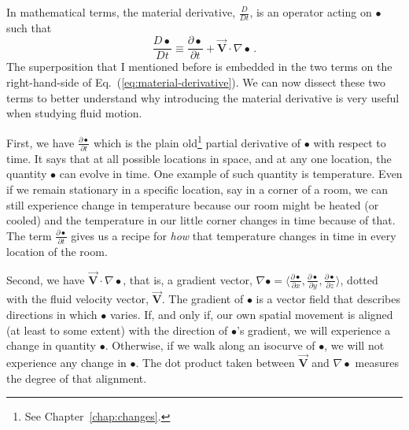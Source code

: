 In mathematical terms, the material derivative, $\frac{D}{Dt}$, is an operator acting on $\bullet$ such that
\begin{equation} \label{eq:material-derivative}
\frac{D \bullet}{D t} \equiv \frac{\partial \bullet}{\partial t} + \vec{\bm{V}} \cdot \nabla \bullet \, .
\end{equation}
The superposition that I mentioned before is embedded in the two terms on the right-hand-side of Eq.~(\ref{eq:material-derivative}). We can now dissect these two terms to better understand why introducing the material derivative is very useful when studying fluid motion.

First, we have $\frac{\partial \bullet}{\partial t}$ which is the plain old\footnote{See Chapter~\ref{chap:changes}.} partial derivative of $\bullet$ with respect to time. It says that at all possible locations in space, and at any one location, the quantity $\bullet$ can evolve in time. One example of such quantity is temperature. Even if we remain stationary in a specific location, say in a corner of a room, we can still experience change in temperature because our room might be heated (or cooled) and the temperature in our little corner changes in time because of that. The term $\frac{\partial \bullet}{\partial t}$ gives us a recipe for \textit{how} that temperature changes in time in every location of the room.

Second, we have $\vec{\bm{V}} \cdot \nabla \bullet$, that is, a gradient vector, $\nabla \bullet = \langle \frac{\partial \bullet}{\partial x}, \frac{\partial \bullet}{\partial y}, \frac{\partial \bullet}{\partial z} \rangle$, dotted with the fluid velocity vector, $\vec{\bm{V}}$. 
The gradient of $\bullet$ is a vector field that describes directions in which $\bullet$ varies. If, and only if, our own spatial movement is aligned (at least to some extent) with the direction of $\bullet$'s gradient, we will experience a change in quantity $\bullet$. Otherwise, if we walk along an isocurve of $\bullet$, we will not experience any change in $\bullet$. The dot product taken between $\vec{\bm{V}}$ and $\nabla \bullet$ measures the degree of that alignment.

